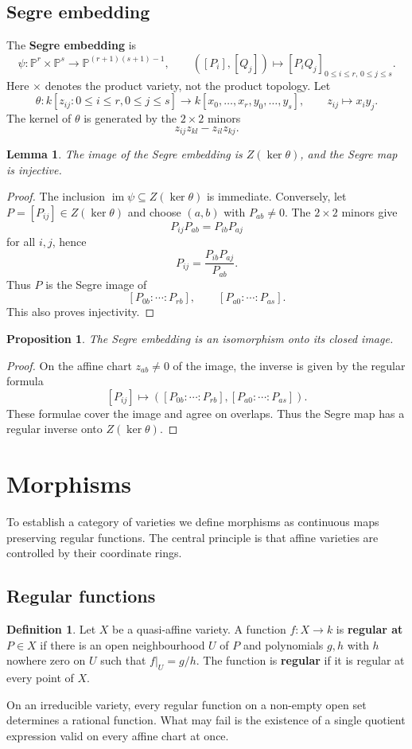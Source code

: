 \documentclass[12pt]{article}
\theoremstyle{plain}
\newtheorem{proposition}[thm]{Proposition}
\newtheorem{lemma}[thm]{Lemma}
\theoremstyle{definition}
\newtheorem{defn}[thm]{Definition} %
\newcommand{\bb}[1]{\mathbb{#1}}
\newcommand{\im}{\operatorname{im}}
\begin{document}
\subsection{Segre embedding}\label{subsec:segre}
The \textbf{Segre embedding} is
\[
\psi:\bb P^r\times\bb P^s\longrightarrow \bb P^{(r+1)(s+1)-1},\qquad
([P_i],[Q_j])\longmapsto [P_iQ_j]_{0\leq i\leq r,\,0\leq j\leq s}.
\]
Here $\times$ denotes the product variety, not the product topology.  Let
\[
\theta:k[z_{ij}:0\leq i\leq r,0\leq j\leq s]\longrightarrow k[x_0,\ldots,x_r,y_0,\ldots,y_s],\qquad z_{ij}\longmapsto x_i y_j.
\]
The kernel of $\theta$ is generated by the $2\times2$ minors
\[
z_{ij}z_{kl}-z_{il}z_{kj}.
\]
\begin{lemma}\label{lem:segre_image}
The image of the Segre embedding is $Z(\ker\theta)$, and the Segre map is injective.
\end{lemma}
\begin{proof}
The inclusion $\im\psi\subseteq Z(\ker\theta)$ is immediate. Conversely, let $P=[P_{ij}]\in Z(\ker\theta)$ and choose $(a,b)$ with $P_{ab}\neq0$. The $2\times2$ minors give
\[
P_{ij}P_{ab}=P_{ib}P_{aj}
\]
for all $i,j$, hence
\[
P_{ij}=\frac{P_{ib}P_{aj}}{P_{ab}}.
\]
Thus $P$ is the Segre image of
\[
[P_{0b}:\cdots:P_{rb}],\qquad [P_{a0}:\cdots:P_{as}].
\]
This also proves injectivity.
\end{proof}
\begin{proposition}\label{prop:segre_isomorphism}
The Segre embedding is an isomorphism onto its closed image.
\end{proposition}
\begin{proof}
On the affine chart $z_{ab}\neq0$ of the image, the inverse is given by the regular formula
\[
[P_{ij}]\longmapsto ([P_{0b}:\cdots:P_{rb}], [P_{a0}:\cdots:P_{as}]).
\]
These formulae cover the image and agree on overlaps. Thus the Segre map has a regular inverse onto $Z(\ker\theta)$.
\end{proof}

\section{Morphisms}
To establish a category of varieties we define morphisms as continuous maps preserving regular functions. The central principle is that affine varieties are controlled by their coordinate rings.

\subsection{Regular functions}
\begin{defn}\label{def:regular_function_quasiaffine}
Let $X$ be a quasi-affine variety. A function $f:X\to k$ is \textbf{regular at} $P\in X$ if there is an open neighbourhood $U$ of $P$ and polynomials $g,h$ with $h$ nowhere zero on $U$ such that $f|_U=g/h$. The function is \textbf{regular} if it is regular at every point of $X$.
\end{defn}
On an irreducible variety, every regular function on a non-empty open set determines a rational function. What may fail is the existence of a single quotient expression valid on every affine chart at once.
\end{document}
